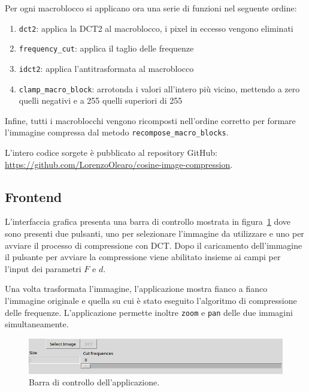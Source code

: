 \documentclass[a4paper, 12pt]{article}
\renewenvironment{shaded}{%
  \def\FrameCommand{\fboxsep=\FrameSep \colorbox{shadecolor}}%
  \MakeFramed{\advance\hsize-\width \FrameRestore\FrameRestore}}%
 {\endMakeFramed}
\begin{document}
Per ogni macroblocco si applicano ora una serie di funzioni nel seguente ordine:
\begin{enumerate}
  \item \texttt{dct2}: applica la DCT2 al macroblocco, i pixel in eccesso
    vengono eliminati
  \item \texttt{frequency\_cut}: applica il taglio delle frequenze
  \item \texttt{idct2}: applica l'antitrasformata al macroblocco
  \item \texttt{clamp\_macro\_block}: arrotonda i valori all'intero più vicino,
    mettendo a zero quelli negativi e a 255 quelli superiori di 255
\end{enumerate}

Infine, tutti i macroblocchi vengono ricomposti nell'ordine corretto per formare
l'immagine compressa dal metodo \texttt{recompose\_macro\_blocks}.

\begin{shaded}
  \centering
  L'intero codice sorgete è pubblicato al repository GitHub: \\
  \url{https://github.com/LorenzoOlearo/cosine-image-compression}.

\end{shaded}


\subsection{Frontend}
L'interfaccia grafica presenta una barra di controllo mostrata in 
figura~\ref{fig:control-bar} dove sono presenti due pulsanti, uno per 
selezionare l'immagine da utilizzare e uno per avviare il processo di 
compressione con DCT. Dopo il caricamento dell'immagine il pulsante per avviare 
la compressione viene abilitato insieme ai campi per l'input dei parametri 
$F$ e $d$.

Una volta trasformata l'immagine, l'applicazione mostra fianco a fianco
l'immagine originale e quella su cui è stato eseguito l'algoritmo di
compressione delle frequenze. L'applicazione permette inoltre \texttt{zoom} e
\texttt{pan} delle due immagini simultaneamente.

\begin{figure}[h]
  \centering
  \includegraphics[width=\textwidth]{./imgs/control-bar.png}
  \caption{Barra di controllo dell'applicazione.}
  \label{fig:control-bar}
\end{figure}
\end{document}
